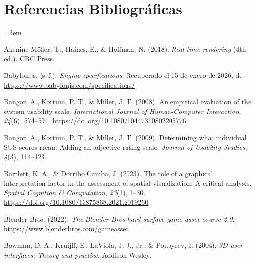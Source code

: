 
\section{Referencias Bibliográficas}

\begin{list}{}{%
    \setlength{\leftmargin}{1.27cm}
    \setlength{\itemindent}{-1.27cm}
    \setlength{\itemsep}{0pt}
    \setlength{\parsep}{0pt}
    \setlength{\topsep}{0pt}
    \setlength{\listparindent}{0pt}
    \setlength{\labelwidth}{0pt}
    \setlength{\labelsep}{0pt}
}
\RaggedRight
\sloppy
\emergencystretch=3em

\item Akenine-Möller, T., Haines, E., \& Hoffman, N. (2018). \textit{Real-time rendering} (4th ed.). CRC Press.

\item Babylon.js. (s.\,f.). \textit{Engine specifications}. Recuperado el 15 de enero de 2026, de \url{https://www.babylonjs.com/specifications/}

\item Bangor, A., Kortum, P. T., \& Miller, J. T. (2008). An empirical evaluation of the system usability scale. \textit{International Journal of Human-Computer Interaction}, \textit{24}(6), 574--594. \url{https://doi.org/10.1080/10447310802205776}

\item Bangor, A., Kortum, P. T., \& Miller, J. T. (2009). Determining what individual SUS scores mean: Adding an adjective rating scale. \textit{Journal of Usability Studies}, \textit{4}(3), 114--123.

\item Bartlett, K. A., \& Dorribo Camba, J. (2023). The role of a graphical interpretation factor in the assessment of spatial visualization: A critical analysis. \textit{Spatial Cognition \& Computation}, \textit{23}(1), 1--30. \url{https://doi.org/10.1080/13875868.2021.2019260}

\item Blender Bros. (2022). \textit{The Blender Bros hard surface game asset course 2.0}. \url{https://www.blenderbros.com/gameasset}

\item Bowman, D. A., Kruijff, E., LaViola, J. J., Jr., \& Poupyrev, I. (2004). \textit{3D user interfaces: Theory and practice}. Addison-Wesley.


\end{list}
